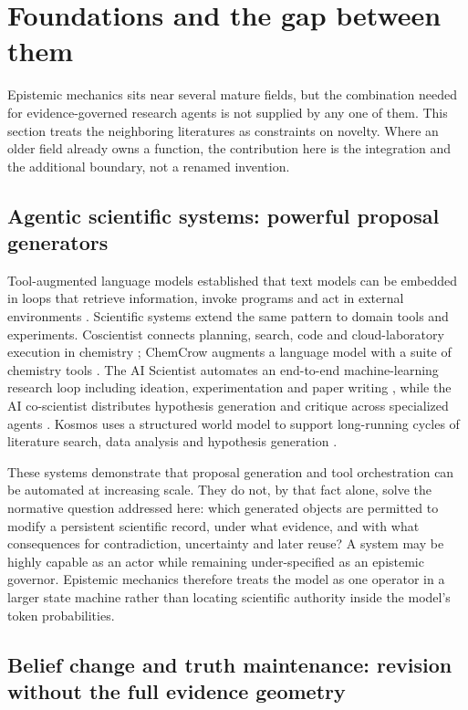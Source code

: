 \section{Foundations and the gap between them}\label{sec:foundations}

Epistemic mechanics sits near several mature fields, but the combination needed for evidence-governed research agents is not supplied by any one of them. This section treats the neighboring literatures as constraints on novelty. Where an older field already owns a function, the contribution here is the integration and the additional boundary, not a renamed invention.

\subsection{Agentic scientific systems: powerful proposal generators}

Tool-augmented language models established that text models can be embedded in loops that retrieve information, invoke programs and act in external environments \cite{lewis2020,yao2023,schick2023,mialon2023}. Scientific systems extend the same pattern to domain tools and experiments. Coscientist connects planning, search, code and cloud-laboratory execution in chemistry \cite{boiko2023}; ChemCrow augments a language model with a suite of chemistry tools \cite{bran2024}. The AI Scientist automates an end-to-end machine-learning research loop including ideation, experimentation and paper writing \cite{lu2024}, while the AI co-scientist distributes hypothesis generation and critique across specialized agents \cite{gottweis2025}. Kosmos uses a structured world model to support long-running cycles of literature search, data analysis and hypothesis generation \cite{kosmos2025}.

These systems demonstrate that proposal generation and tool orchestration can be automated at increasing scale. They do not, by that fact alone, solve the normative question addressed here: which generated objects are permitted to modify a persistent scientific record, under what evidence, and with what consequences for contradiction, uncertainty and later reuse? A system may be highly capable as an actor while remaining under-specified as an epistemic governor. Epistemic mechanics therefore treats the model as one operator in a larger state machine rather than locating scientific authority inside the model's token probabilities.

\subsection{Belief change and truth maintenance: revision without the full evidence geometry}

